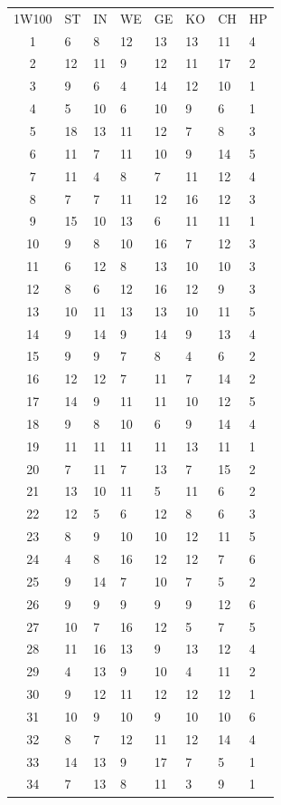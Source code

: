 \documentclass[11pt]{wbzine}
\begin{document}
\begin{tabularx}{\textwidth}{cYYYYYYY}
1W100 & ST & IN & WE & GE & KO & CH & HP \\
   1 &  6  &  8  &  12  &  13  &  13  &  11   &  4 \\ 
   2  & 12 & 11 & 9 & 12 & 11 & 17 & 2 \\
    3 & 9 & 6 & 4 & 14 & 12 & 10 & 1 \\
    4 & 5 & 10 & 6 & 10 & 9 & 6 & 1 \\
    5 & 18 & 13 & 11 & 12 & 7 & 8 & 3 \\ 
    6 & 11 & 7 & 11 & 10 & 9 & 14 & 5 \\
    7 & 11 & 4 & 8 & 7 & 11 & 12 & 4 \\
    8 & 7 & 7 & 11 & 12 & 16 & 12 & 3 \\ 
    9 & 15 & 10 & 13 & 6 & 11 & 11 & 1 \\
    10 & 9 & 8 & 10 & 16 & 7 & 12 & 3 \\ 
    11 & 6 & 12 & 8 & 13 & 10 & 10 & 3 \\
    12 & 8 & 6 & 12 & 16 & 12 & 9 & 3 \\ 
    13 & 10 & 11 & 13 & 13 & 10 & 11 & 5 \\
    14 & 9 & 14 & 9 & 14 & 9 & 13 & 4 \\ 
    15 & 9 & 9 & 7 & 8 & 4 & 6 & 2 \\ 
    16 & 12 & 12 & 7 & 11 & 7 & 14 & 2 \\ 
    17 & 14 & 9 & 11 & 11 & 10 & 12 & 5 \\ 
    18 & 9 & 8 & 10 & 6 & 9 & 14 & 4 \\
    19 & 11 & 11 & 11 & 11 & 13 & 11 & 1 \\ 
    20 & 7 & 11 & 7 & 13 & 7 & 15 & 2 \\ 
    21 & 13 & 10 & 11 & 5 & 11 & 6 & 2 \\
    22 & 12 & 5 & 6 & 12 & 8 & 6 & 3 \\ 
    23 & 8 & 9 & 10 & 10 & 12 & 11 & 5 \\
    24 & 4 & 8 & 16 & 12 & 12 & 7 & 6 \\
    25 & 9 & 14 & 7 & 10 & 7 & 5 & 2 \\
    26 & 9 & 9 & 9 & 9 & 9 & 12 & 6 \\ 
    27 & 10 & 7 & 16 & 12 & 5 & 7 & 5 \\ 
    28 & 11 & 16 & 13 & 9 & 13 & 12 & 4 \\ 
    29 & 4 & 13 & 9 & 10 & 4 & 11 & 2 \\ 
    30 & 9 & 12 & 11 & 12 & 12 & 12 & 1 \\ 
    31 & 10 & 9 & 10 & 9 & 10 & 10 & 6 \\
    32 & 8 & 7 & 12 & 11 & 12 & 14 & 4 \\ 
    33 & 14 & 13 & 9 & 17 & 7 & 5 & 1 \\ 
    34 & 7 & 13 & 8 & 11 & 3 & 9 & 1 \\ 
\end{tabularx}
\end{document}
